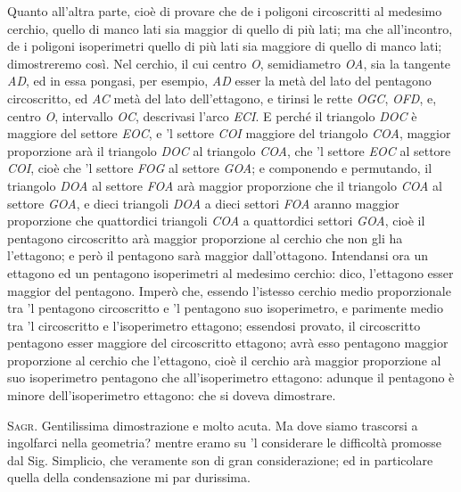 \documentclass[11pt,twoside,openany]{book}
\newcommand{\speaker}[1]{\textcolor{rubric}{\textsc{#1}}\space}
\begin{document}
Quanto all'altra parte, cioè di provare che de i poligoni circoscritti al medesimo cerchio, quello di manco lati sia maggior di quello di più lati; ma che all'incontro, de i poligoni isoperimetri quello di più lati sia maggiore di quello di manco lati; dimostreremo così. Nel cerchio, il cui centro \emph{O}, semidiametro \emph{OA}, sia la tangente \emph{AD}, ed in essa pongasi, per esempio, \emph{AD} esser la metà del lato del pentagono circoscritto, ed \emph{AC} metà del lato dell'ettagono, e tirinsi le rette \emph{OGC}, \emph{OFD}, e, centro \emph{O}, intervallo \emph{OC}, descrivasi l'arco \emph{ECI}. E perché il triangolo \emph{DOC} è maggiore del settore \emph{EOC}, e 'l settore \emph{COI} maggiore del triangolo \emph{COA}, maggior proporzione arà il triangolo \emph{DOC} al triangolo \emph{COA}, che 'l settore \emph{EOC} al settore \emph{COI}, cioè che 'l settore \emph{FOG} al settore \emph{GOA}; e componendo e permutando, il triangolo \emph{DOA} al settore \emph{FOA} arà maggior proporzione che il triangolo \emph{COA} al settore \emph{GOA}, e dieci triangoli \emph{DOA} a dieci settori \emph{FOA} aranno maggior proporzione che quattordici triangoli \emph{COA} a quattordici settori \emph{GOA}, cioè il pentagono circoscritto arà maggior proporzione al cerchio che non gli ha l'ettagono; e però il pentagono sarà maggior dall'ottagono. Intendansi ora un ettagono ed un pentagono isoperimetri al medesimo cerchio: dico, l'ettagono esser maggior del pentagono. Imperò che, essendo l'istesso cerchio medio proporzionale tra 'l pentagono circoscritto e 'l pentagono suo isoperimetro, e parimente medio tra 'l circoscritto e l'isoperimetro ettagono; essendosi provato, il circoscritto pentagono esser maggiore del circoscritto ettagono; avrà esso pentagono maggior proporzione al cerchio che l'ettagono, cioè il cerchio arà maggior proporzione al suo isoperimetro pentagono che all'isoperimetro ettagono: adunque il pentagono è minore dell'isoperimetro ettagono: che si doveva dimostrare.

\speaker{Sagr.} Gentilissima dimostrazione e molto acuta. Ma dove siamo trascorsi a ingolfarci nella geometria? mentre eramo su 'l considerare le difficoltà promosse dal Sig. Simplicio, che veramente son di gran considerazione; ed in particolare quella della condensazione mi par durissima.
\end{document}
